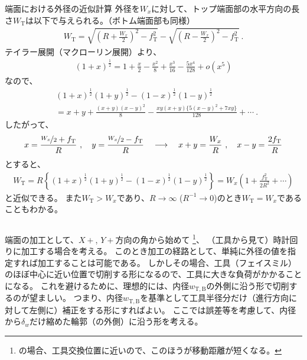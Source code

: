 \begin{Column}{端面における外径の近似計算}
外径を$W_x$に対して、トップ端面部の水平方向の長さ$W_\mathrm T$は以下で与えられる。（ボトム端面部も同様）
\begin{align*}
  W_\mathrm T
  = \sqrt{\left(R+\frac{W_x}2\right)^{\!2}-f_\mathrm T^2}
    -\sqrt{\left(R-\frac{W_x}2\right)^{\!2}-f_\mathrm T^2}\ .
\end{align*}
テイラー展開（マクローリン展開）より、
\begin{align*}
  (1+x)^\frac12 = 1+\frac x2-\frac{x^2}8+\frac{x^3}{16}-\frac{5x^4}{128}+o\!\left(x^5\right)
\end{align*}
なので、
\begin{align*}
  & (1+x)^\frac12(1+y)^\frac12-(1-x)^\frac12(1-y)^\frac12\\
  &= x+y+\frac{(x+y)(x-y)^2}8-\frac{xy(x+y)\big\{5(x-y)^2+7xy\big\}}{128}+\cdots\ .
\end{align*}
したがって、
\begin{align*}
  x = \frac{\nicefrac{W_x}2+f_\mathrm T}R\ ,\quad y = \frac{\nicefrac{W_x}2-f_\mathrm T}R\quad
  \longrightarrow \quad
  x+y = \frac{W_x}R\ , \quad x-y = \frac{2f_\mathrm T}R
\end{align*}
とすると、
\begin{align*}
  W_\mathrm T
  = R\left\{(1+x)^\frac12(1+y)^\frac12-(1-x)^\frac12(1-y)^\frac12\right\}
  = W_x\!\left(1+\frac{f_\mathrm T^2}{2R^2}+\cdots\right)
\end{align*}
と近似できる。
また$W_\mathrm T > W_x$であり、$R\to\infty$ ($R^{-1}\to0$)のとき$W_\mathrm T = W_x$であることもわかる。
\end{Column}




\clearpage
端面の加工として、$X+$, $Y+$方向の角から始めて
\footnote{\DMname の場合、工具交換位置に近いので、このほうが移動距離が短くなる。}、
（工具から見て）時計回りに加工する場合を考える。
このとき加工の経路として、単純に外径の値を指定すれば加工することは可能である。
しかしその場合、工具（フェイスミル）のほぼ中心に近い位置で切削する形になるので、工具に大きな負荷がかかることになる。
これを避けるために、理想的には、内径$w_{\mathrm T, \mathrm B}$の外側に沿う形で切削するのが望ましい。
つまり、内径$w_{\mathrm T, \mathrm B}$を基準として工具半径分だけ（進行方向に対して左側に）補正をする形にすればよい。
ここでは誤差等を考慮して、内径から$\delta_w$だけ縮めた輪郭（の外側）に沿う形を考える。



